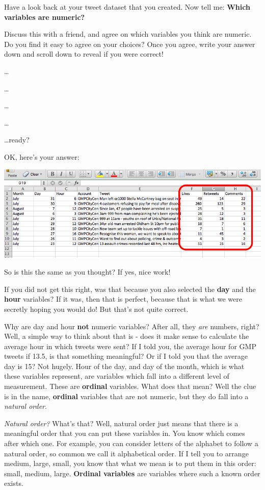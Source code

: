 \documentclass[
]{book}
\begin{document}
Have a look back at your tweet dataset that you created. Now tell me: \textbf{Which variables are numeric?}

Discuss this with a friend, and agree on which variables you think are numeric. Do you find it easy to agree on your choices? Once you agree, write your answer down and scroll down to reveal if you were correct!

\ldots{}

\ldots{}

\ldots{}

\ldots{}

\ldots ready?

OK, here's your answer:

\includegraphics{imgs/num_vars.png}

So is this the same as you thought? If yes, nice work!

If you did not get this right, was that because you also selected the \textbf{day} and the \textbf{hour} variables? If it was, then that is perfect, because that is what we were secretly hoping you would do! But that's not quite correct.

Why are day and hour \textbf{not} numeric variables? After all, they \emph{are} numbers, right? Well, a simple way to think about that is - does it make sense to calculate the average hour in which tweets were sent? If I told you, the average hour for GMP tweets if 13.5, is that something meaningful? Or if I told you that the average day is 15? Not hugely. Hour of the day, and day of the month, which is what these variables represent, are variables which fall into a different level of measurement. These are \textbf{ordinal} variables. What does that mean? Well the clue is in the name, \textbf{ordinal} variables that are not numeric, but they do fall into a \emph{natural order}.

\emph{Natural order?} What's that? Well, natural order just means that there is a meaningful order that you can put these variables in. You know which comes after which one. For example, you can consider letters of the alphabet to follow a natural order, so common we call it alphabetical order. If I tell you to arrange medium, large, small, you know that what we mean is to put them in this order: small, medium, large. \textbf{Ordinal variables} are variables where such a known order exists.
\end{document}
